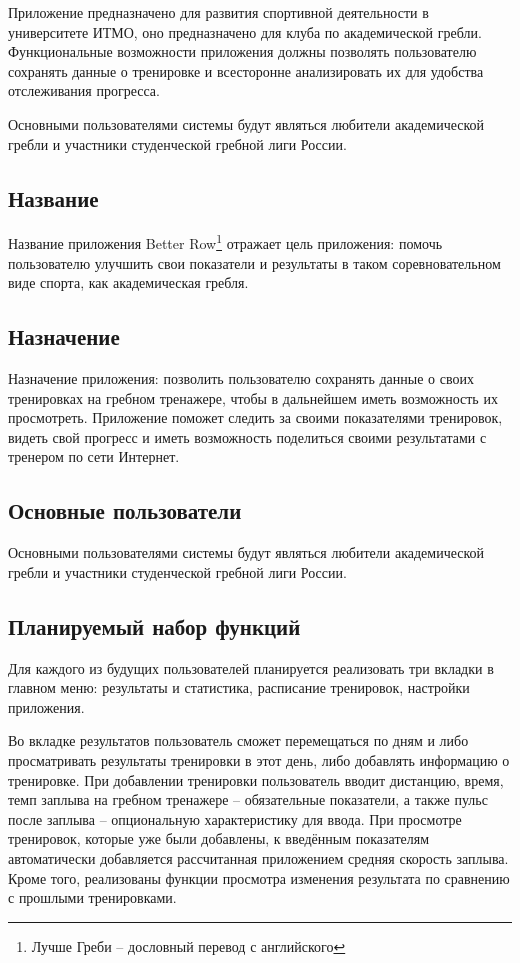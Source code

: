 \documentclass[14pt]{extreport}
\begin{document}
Приложение предназначено для развития спортивной деятельности в университете ИТМО, оно предназначено для клуба по академической гребли. Функциональные возможности приложения должны позволять пользователю сохранять данные о тренировке и всесторонне анализировать их для удобства отслеживания прогресса.

Основными пользователями системы будут являться любители академической гребли и участники студенческой гребной лиги России.

\subsection{Название}

Название приложения {Better Row}\footnote{Лучше Греби – дословный перевод с английского} отражает цель приложения: помочь пользователю улучшить свои показатели и результаты в таком соревновательном виде спорта, как академическая гребля.

\subsection{Назначение}

Назначение приложения: позволить пользователю сохранять данные о своих тренировках на гребном тренажере, чтобы в дальнейшем иметь возможность их просмотреть. Приложение поможет следить за своими показателями тренировок, видеть свой прогресс и иметь возможность поделиться своими результатами с тренером по сети Интернет.

\subsection{Основные пользователи}

Основными пользователями системы будут являться любители академической гребли и участники студенческой гребной лиги России.

\subsection{Планируемый набор функций}

Для каждого из будущих пользователей планируется реализовать три вкладки в главном меню: результаты и статистика, расписание тренировок, настройки приложения.

Во вкладке результатов пользователь сможет перемещаться по дням и либо просматривать результаты тренировки в этот день, либо добавлять информацию о тренировке. При добавлении тренировки пользователь вводит дистанцию, время, темп заплыва на гребном тренажере – обязательные показатели, а также пульс после заплыва – опциональную характеристику для ввода. При просмотре тренировок, которые уже были добавлены, к введённым показателям автоматически добавляется рассчитанная приложением средняя скорость заплыва. Кроме того, реализованы функции просмотра изменения результата по сравнению с прошлыми тренировками.
\end{document}
